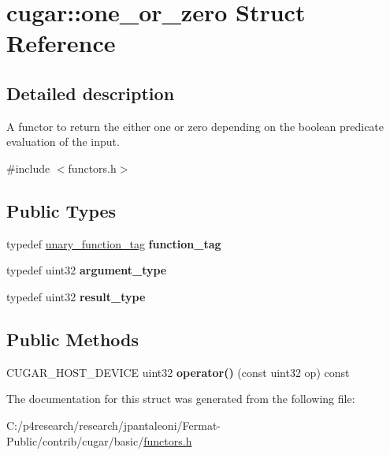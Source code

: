 \hypertarget{structcugar_1_1one__or__zero}{}\section{cugar\+:\+:one\+\_\+or\+\_\+zero Struct Reference}
\label{structcugar_1_1one__or__zero}


\subsection{Detailed description}
A functor to return the either one or zero depending on the boolean predicate evaluation of the input. 

{\ttfamily \#include $<$functors.\+h$>$}

\subsection*{Public Types}
\begin{DoxyCompactItemize}
\item 
\mbox{\label{structcugar_1_1one__or__zero_a2884cc3d1cb3eccee908acaea747594a}} 
typedef \hyperlink{structcugar_1_1unary__function__tag}{unary\+\_\+function\+\_\+tag} {\bfseries function\+\_\+tag}
\item 
\mbox{\label{structcugar_1_1one__or__zero_ac5e31c40a43ea3d3fba9e5f0eead97dc}} 
typedef uint32 {\bfseries argument\+\_\+type}
\item 
\mbox{\label{structcugar_1_1one__or__zero_a9ad2e25ed02cbb9c3468192f4e112ccd}} 
typedef uint32 {\bfseries result\+\_\+type}
\end{DoxyCompactItemize}
\subsection*{Public Methods}
\begin{DoxyCompactItemize}
\item 
\mbox{\label{structcugar_1_1one__or__zero_af3654d72bd8abe827ffc6f22589c6c16}} 
C\+U\+G\+A\+R\+\_\+\+H\+O\+S\+T\+\_\+\+D\+E\+V\+I\+CE uint32 {\bfseries operator()} (const uint32 op) const
\end{DoxyCompactItemize}


The documentation for this struct was generated from the following file\+:\begin{DoxyCompactItemize}
\item 
C\+:/p4research/research/jpantaleoni/\+Fermat-\/\+Public/contrib/cugar/basic/\hyperlink{functors_8h}{functors.\+h}\end{DoxyCompactItemize}

